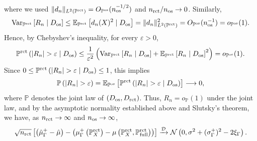where we used $\|d_n\|_{L^2(\mathbb{P}^{\operatorname{rct}})} = O_{\mathbb{P}^{\operatorname{os}}}(n_{\operatorname{os}}^{-1/2})$ and $n_{\operatorname{rct}}/n_{\operatorname{os}} \to 0$. Similarly,
\[
\operatorname{Var}_{\mathbb{P}^{\operatorname{rct}}}\left[R_n \mid D_{\mathrm{os}}\right]
\leq \mathbb{E}_{\mathbb{P}^{\operatorname{rct}}}\left[d_n(X)^2 \mid D_{\mathrm{os}}\right]
= \|d_n\|_{L^2(\mathbb{P}^{\operatorname{rct}})}^2
= O_{\mathbb{P}^{\operatorname{os}}}(n_{\operatorname{os}}^{-1})
= o_{\mathbb{P}^{\operatorname{os}}}(1).
\]
Hence, by Chebyshev's inequality, for every $\varepsilon > 0$,
\[
\prct\left(|R_n|>\varepsilon \mid \dataobs\right)
\leq \frac{1}{\varepsilon^2}\left(\var_{\prct}\left[R_n \mid \dataobs\right] + \EE_{\prct}\left[R_n \mid \dataobs\right]^2\right)
= o_{\pobs}(1).
\]
Since $0 \leq \prct\left(|R_n|>\varepsilon \mid \dataobs\right) \leq 1$, this implies
\[
\mathbb P\left(|R_n|>\varepsilon\right)
= \EE_{\pobs}\left[\prct\left(|R_n|>\varepsilon \mid \dataobs\right)\right]
\longrightarrow 0,
\]
where $\mathbb P$ denotes the joint law of $(D_{\mathrm{os}},D_{\operatorname{rct}})$. Thus, $R_n=o_{\mathbb P}(1)$ under the joint law, and by the asymptotic normality established above and Slutsky's theorem, we have, as $n_{\operatorname{rct}} \to \infty$ and $n_{\operatorname{os}} \to \infty$,
\begin{equation}
	\label{eq:as_norm_1}
\sqrt{n_{\operatorname{rct}}}\left[\left(\hat{\mu}_\Gamma^+ - \hat{\mu}\right)-\left(\mu_\Gamma^+\left(\mathbb{P}^{\operatorname{rct}}_X\right) - \mu\left(\mathbb{P}^{\operatorname{rct}}_X, \mathbb{P} ^{\operatorname{rct}}_{\operatorname{full}} \right)\right)\right]\xrightarrow{\mathcal{D}} \mathcal{N} \left(0,  \sigma^2  +(\sigma^+_\Gamma)^2 -2\xi_\Gamma\right).
\end{equation}


